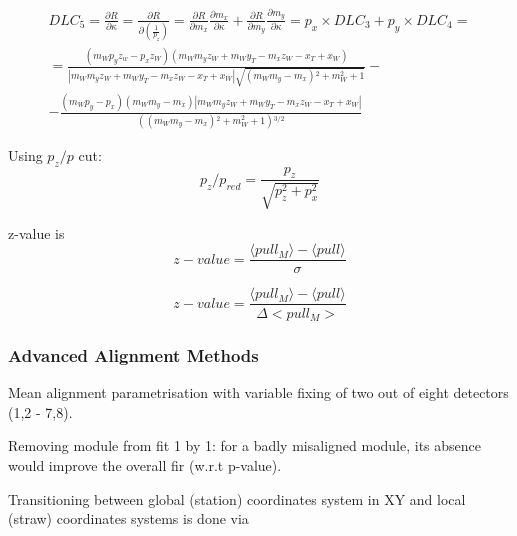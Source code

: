 \documentclass[a4paper,11pt]{article}
\begin{document}
\begin{equation}
\begin{split}
DLC_5 = \frac{ \partial R}{\partial \kappa} = \frac{ \partial R}{\partial \left(\frac{1}{p_z}\right)} = \frac{ \partial R}{\partial m_x}\frac{ \partial m_x}{\partial \kappa} + \frac{ \partial R}{\partial m_y}\frac{ \partial m_y}{\partial \kappa} = p_x \times DLC_3 + p_y \times DLC_4 = \\
= \frac{(m_W p_y z_w-p_x z_W)(m_W m_y z_W+m_W y_T-m_x z_W-x_T+x_W)}{|m_W m_y z_W+m_W y_T-m_x z_W-x_T+x_W|\sqrt{\left(m_W m_y-m_x\right){}^2+m_W^2+1}} - \\
-\frac{\left(m_W p_y-p_x\right) \left(m_W m_y-m_x\right) |m_W m_y z_W+m_W y_T-m_x z_W-x_T+x_W|}{\left(\left(m_W m_y-m_x\right){}^2+m_W^2+1\right){}^{3/2}}
\end{split}
\end{equation}


Using  $p_z/p$ cut:
\begin{equation}
p_z/p_{red} = \frac{p_z}{\sqrt{p_z^2+p_x^2}}
\end{equation}


z-value is 
\begin{equation}
z-value = \frac{\langle pull_M \rangle - \langle pull \rangle}{\sigma}
\end{equation}

\begin{equation}
z-value = \frac{\langle pull_M \rangle - \langle pull \rangle}{\Delta <pull_M>}
\end{equation}


\subsubsection{Advanced Alignment Methods}
Mean alignment parametrisation with variable fixing of two out of eight detectors (1,2 - 7,8).

Removing module from fit 1 by 1: for a badly misaligned module, its absence would improve the overall fir (w.r.t p-value). 

Transitioning between global (station) coordinates system in XY and local (straw) coordinates systems is done via 
\end{document}
